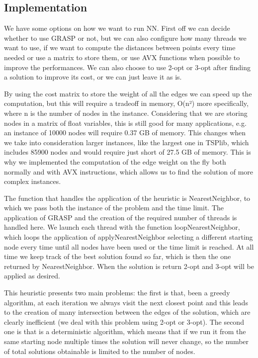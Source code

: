 \subsection{Implementation}
We have some options on how we want to run NN. First off we can decide whether to use GRASP or not, but we can also configure 
how many threads we want to use, if we want to compute the distances between points every time needed or use a matrix to store 
them, or use AVX functions when possible to improve the performances. We can also choose to use 2-opt or 3-opt after finding a 
solution to improve its cost, or we can just leave it as is.

By using the cost matrix to store the weight of all the edges we can speed up the computation, but this will require a tradeoff 
in memory, O(n²) more specifically, where n is the number of nodes in the instance. Considering that we are storing nodes in a 
matrix of float variables, this is still good for many applications, e.g. an instance of 10000 nodes will require 0.37 GB of 
memory. This changes when we take into consideration larger instances, like the largest one in TSPlib, which includes 85900 
nodes and would require just short of 27.5 GB of memory.
This is why we implemented the computation of the edge weight on the fly both normally and with AVX instructions, which allows 
us to find the solution of more complex instances.

The function that handles the application of the heuristic is NearestNeighbor, to which we pass both the instance of the 
problem and the time limit. The application of GRASP and the creation of the required number of threads is handled here.
We launch each thread with the function loopNearestNeighbor, which loops the application of applyNearestNeighbor selecting 
a different starting node every time until all nodes have been used or the time limit is reached.
At all time we keep track of the best solution found so far, which is then the one returned by NearestNeighbor. When the 
solution is return 2-opt and 3-opt will be applied as desired.

This heuristic presents two main problems: the first is that, been a greedy algorithm, at each iteration we always visit 
the next closest point and this leads to the creation of many intersection between the edges of the solution, which are 
clearly inefficient (we deal with this problem using 2-opt or 3-opt). The second one is that is a deterministic algorithm, 
which means that if we run it from the same starting node multiple times the solution will never change, so the number 
of total solutions obtainable is limited to the number of nodes.


